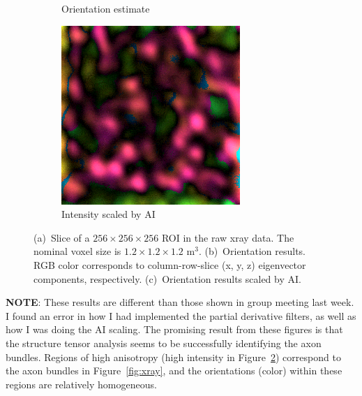\documentclass[11pt]{article}
\begin{document}
\begin{figure}[h]
\begin{subfigure}[b]{0.3\textwidth}
    \caption{Orientation estimate\label{fig:rgb_raw}}
  \end{subfigure}
  \hspace{1em}
  \begin{subfigure}[b]{0.30\textwidth}
    \centering \includegraphics[width=\textwidth]{../figs/RGB_scaled_d2_n7_sl84}
    \caption{Intensity scaled by AI\label{fig:rgb_scaled}}
  \end{subfigure}
  \caption{(a)~Slice of a $256\times256\times256$ ROI in the raw xray data. The
    nominal voxel size is $1.2\times1.2\times1.2$ \textmu m$^3$. (b)~Orientation
    results. RGB color corresponds to column-row-slice (x, y, z) eigenvector
    components, respectively. (c)~Orientation results scaled by
    AI.\label{fig:sample}}
\end{figure}

\textbf{NOTE}: These results are different than those shown in group meeting
last week. I found an error in how I had implemented the partial derivative
filters, as well as how I was doing the AI scaling. The promising result from
these figures is that the structure tensor analysis seems to be successfully
identifying the axon bundles. Regions of high anisotropy (high intensity in
Figure~\ref{fig:rgb_scaled}) correspond to the axon bundles in
Figure~\ref{fig:xray}, and the orientations (color) within these regions are
relatively homogeneous.
  
\end{document}
